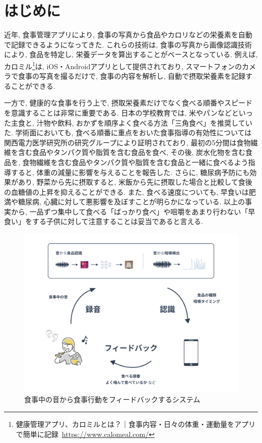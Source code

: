 
\chapter{はじめに}
\label{cha:intro}

近年, 食事管理アプリにより, 食事の写真から食品やカロリなどの栄養素を自動で記録できるようになってきた. これらの技術は, 食事の写真から画像認識技術により, 食品を特定し, 栄養データを算出することがベースとなっている. 例えば, カロミル\footnote{健康管理アプリ、カロミルとは？｜食事内容・日々の体重・運動量をアプリで簡単に記録~\url{https://www.calomeal.com/}}は, iOS・Androidアプリとして提供されており, スマートフォンのカメラで食事の写真を撮るだけで, 食事の内容を解析し, 自動で摂取栄養素を記録することができる.

一方で, 健康的な食事を行う上で, 摂取栄養素だけでなく食べる順番やスピードを意識することは非常に重要である. 日本の学校教育では, 米やパンなどといった主食と, 汁物や飲料, おかずを順序よく食べる方法「三角食べ」を推奨していた. 学術面においても, 食べる順番に重点をおいた食事指導の有効性については関西電力医学研究所の研究グループにより証明されており, 最初の5分間は食物繊維を含む食品やタンパク質や脂質を含む食品を食べ, その後, 炭水化物を含む食品を, 食物繊維を含む食品やタンパク質や脂質を含む食品と一緒に食べるよう指導すると, 体重の減量に影響を与えることを報告した\cite{yabe2019107450}. さらに, 糖尿病予防にも効果があり, 野菜から先に摂取すると, 米飯から先に摂取した場合と比較して食後の血糖値の上昇を抑えることができる\cite{tonyobyo53112}. また, 食べる速度についても, 早食いは肥満や糖尿病, 心臓に対して悪影響を及ぼすことが明らかになっている\cite{20249}\cite{beyond_willpower}. 以上の事実から, 一品ずつ集中して食べる「ばっかり食べ」や咀嚼をあまり行わない「早食い」をする子供に対して注意することは妥当であると言える.

\begin{figure}[t]
  \begin{center}
    \includegraphics[clip, width=1.0\hsize]{img/system.png}
    \caption{食事中の音から食事行動をフィードバックするシステム}
    \label{fig:system}
  \end{center}
\end{figure}

